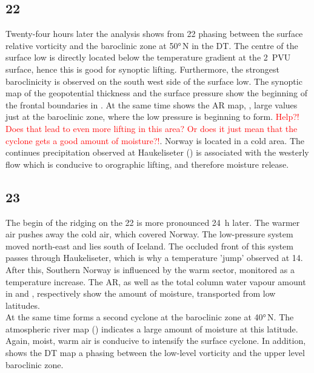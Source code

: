 \subsection*{\SI{22}{\dec}}
\noindent Twenty-four hours later the analysis shows from \SI{22}{\dec} phasing between the surface relative vorticity and the baroclinic zone at \ang{50}{\,N} in the DT. The centre of the surface low is directly located below the temperature gradient at the \SI{2}{PVU} surface, hence this is good for synoptic lifting. Furthermore, the strongest baroclinicity is observed on the south west side of the surface low.
The synoptic map of the geopotential thickness and the surface pressure show the beginning of the frontal boundaries in . 
At the same time shows the AR map, , large values just at the baroclinic zone, where the low pressure is beginning to form. \textcolor{red}{Help?! Does that lead to even more lifting in this area? Or does it just mean that the cyclone gets a good amount of moisture?!}.
Norway is located in a cold area. The continues precipitation observed at Haukeliseter () is associated with the westerly flow which is conducive to orographic lifting, and therefore moisture release.  

\subsection*{\SI{23}{\dec}}
\noindent The begin of the ridging on the \SI{22}{\dec} is more pronounced \SI{24}{\hour} later. The warmer air pushes away the cold air, which covered Norway.
The low-pressure system moved north-east and lies south of Iceland. The occluded front of this system passes through Haukeliseter, which is why a temperature 'jump' observed at \SI{14}{\UTC}. After this, Southern Norway is influenced by the warm sector, monitored as a temperature increase. 
The AR, as well as the total column water vapour amount in  and , respectively show the amount of moisture, transported from low latitudes.
\\
At the same time forms a second cyclone at the baroclinic zone at \ang{40}{\,N}. The atmospheric river map () indicates a large amount of moisture at this latitude. Again, moist, warm air is conducive to intensify the surface cyclone. In addition, shows the DT map a phasing between the low-level vorticity and the upper level baroclinic zone. 

